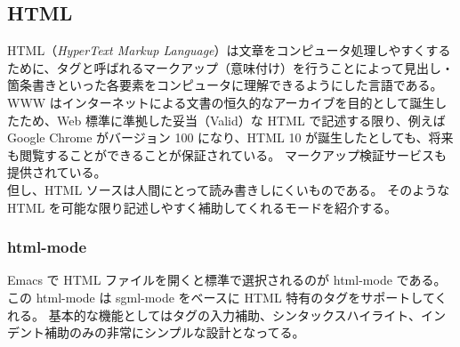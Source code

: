 \subsection{HTML}
HTML（\emph{HyperText Markup Language}）は文章をコンピュータ処理しやすくするために、タグと呼ばれるマークアップ（意味付け）を行うことによって見出し・箇条書きといった各要素をコンピュータに理解できるようにした言語である。
WWW はインターネットによる文書の恒久的なアーカイブを目的として誕生したため、Web 標準に準拠した妥当（Valid）な HTML で記述する限り、例えば Google Chrome がバージョン 100 になり、HTML 10 が誕生したとしても、将来も閲覧することができることが保証されている。\enlargethispage{1.00zw}
マークアップ検証サービスも提供されている。\\

但し、HTML ソースは人間にとって読み書きしにくいものである。
そのような HTML を可能な限り記述しやすく補助してくれるモードを紹介する。
\subsubsection{html-mode}
Emacs で HTML ファイルを開くと標準で選択されるのが html-mode である。
この html-mode は sgml-mode をベースに HTML 特有のタグをサポートしてくれる。
基本的な機能としてはタグの入力補助、シンタックスハイライト、インデント補助のみの非常にシンプルな設計となってる。
